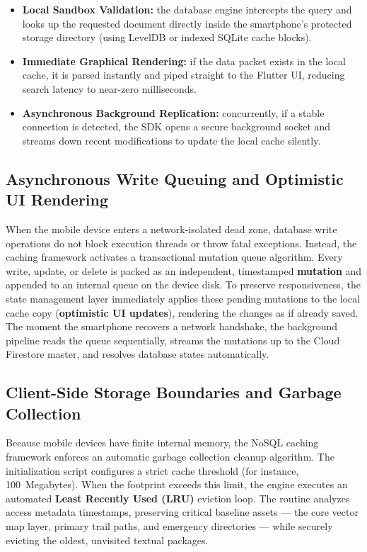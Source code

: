 \documentclass[12pt,a4paper,oneside]{report}
\begin{document}
\begin{itemize}[leftmargin=1.4em]
  \item \textbf{Local Sandbox Validation:} the database engine intercepts the query and
        looks up the requested document directly inside the smartphone's protected storage
        directory (using LevelDB or indexed SQLite cache blocks).
  \item \textbf{Immediate Graphical Rendering:} if the data packet exists in the local
        cache, it is parsed instantly and piped straight to the Flutter UI, reducing
        search latency to near-zero milliseconds.
  \item \textbf{Asynchronous Background Replication:} concurrently, if a stable connection
        is detected, the SDK opens a secure background socket and streams down recent
        modifications to update the local cache silently.
\end{itemize}

\subsection{Asynchronous Write Queuing and Optimistic UI Rendering}

When the mobile device enters a network-isolated dead zone, database write operations do
not block execution threads or throw fatal exceptions. Instead, the caching framework
activates a transactional mutation queue algorithm. Every write, update, or delete is
packed as an independent, timestamped \textbf{mutation} and appended to an internal queue
on the device disk. To preserve responsiveness, the state management layer immediately
applies these pending mutations to the local cache copy (\textbf{optimistic UI updates}),
rendering the changes as if already saved. The moment the smartphone recovers a network
handshake, the background pipeline reads the queue sequentially, streams the mutations up
to the Cloud Firestore master, and resolves database states automatically.

\subsection{Client-Side Storage Boundaries and Garbage Collection}

Because mobile devices have finite internal memory, the NoSQL caching framework enforces
an automatic garbage collection cleanup algorithm. The initialization script configures a
strict cache threshold (for instance, 100~Megabytes). When the footprint exceeds this
limit, the engine executes an automated \textbf{Least Recently Used (LRU)} eviction loop.
The routine analyzes access metadata timestamps, preserving critical baseline assets ---
the core vector map layer, primary trail paths, and emergency directories --- while
securely evicting the oldest, unvisited textual packages.
\end{document}
